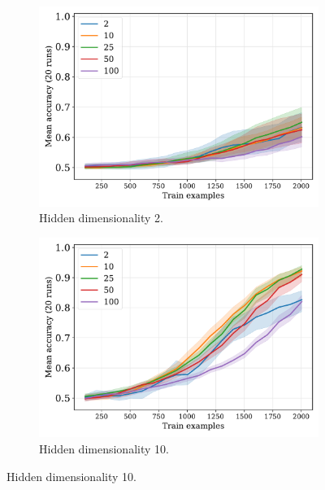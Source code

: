 \documentclass{article}
\begin{document}
\begin{figure}[H]
  \centering

  \begin{subfigure}{0.45\linewidth}
    \includegraphics[width=1\textwidth]{./equality-train_size-embed_dim-hidden_dim=2.pdf}
    \caption{Hidden dimensionality 2.}
  \end{subfigure}
  \hfill
  \begin{subfigure}{0.45\linewidth}
    \includegraphics[width=1\textwidth]{./equality-train_size-embed_dim-hidden_dim=10.pdf}
    \caption{Hidden dimensionality 10.}
  \end{subfigure}

  \vspace{24pt}


\end{figure}
\end{document}
